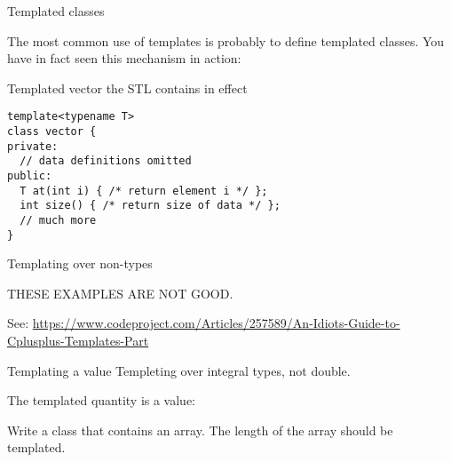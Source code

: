 
 {Templated classes}

The most common use of templates is probably to define templated
classes.
You have in fact seen this mechanism in action:
\begin{block}{Templated vector}
  \label{sl:template-vector}
  the \ac{STL} contains
  in effect
\begin{verbatim}
template<typename T>
class vector {
private:
  // data definitions omitted
public:
  T at(int i) { /* return element i */ };
  int size() { /* return size of data */ };
  // much more
}
\end{verbatim}
\end{block}

 {Templating over non-types}

THESE EXAMPLES ARE NOT GOOD.

See:
\url{https://www.codeproject.com/Articles/257589/An-Idiots-Guide-to-Cplusplus-Templates-Part}

\begin{block}{Templating a value}
  Templeting over integral types, not double.

  The templated quantity is a value:
\end{block}

\begin{exercise}
  Write a class that contains an array. The length of the array should
  be templated.
\end{exercise}
